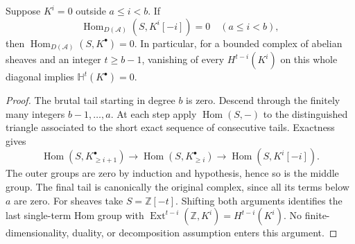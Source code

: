\begin{theorem}
\label{thm:kn-hypercohomology-zero-diagonal}
\leanok
{}
Suppose $K^i=0$ outside $a\leq i<b$.  If
\[
 \operatorname{Hom}_{D(\mathcal A)}(S,K^i[-i])=0
 \quad(a\leq i<b),
\]
then $\operatorname{Hom}_{D(\mathcal A)}(S,K^\bullet)=0$.
In particular, for a bounded complex of abelian sheaves and an integer
$t\geq b-1$, vanishing of every $H^{t-i}(K^i)$ on this whole diagonal
implies $\mathbb H^t(K^\bullet)=0$.
\end{theorem}
\begin{proof}
The brutal tail starting in degree $b$ is zero.  Descend through the
finitely many integers $b-1,\ldots,a$.  At each step apply
$\operatorname{Hom}(S,-)$ to the distinguished triangle associated
to the short exact sequence of consecutive tails.  Exactness gives
\[
 \operatorname{Hom}(S,K_{\geq i+1}^\bullet)
 \longrightarrow\operatorname{Hom}(S,K_{\geq i}^\bullet)
 \longrightarrow\operatorname{Hom}(S,K^i[-i]).
\]
The outer groups are zero by induction and hypothesis, hence so is
the middle group.  The final tail is canonically the original complex,
since all its terms below $a$ are zero.  For sheaves take
$S=\mathbb Z[-t]$.  Shifting both arguments identifies the last
single-term Hom group with
$\operatorname{Ext}^{t-i}(\mathbb Z,K^i)=H^{t-i}(K^i)$.
No finite-dimensionality, duality, or decomposition assumption enters
this argument.
\end{proof}
